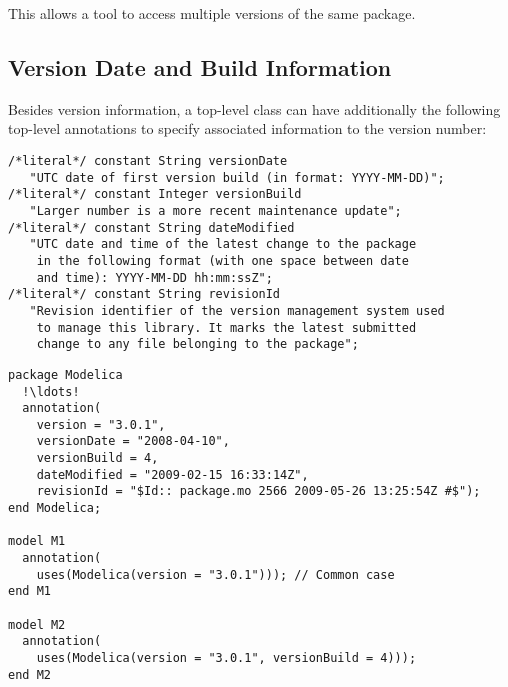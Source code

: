 This allows a tool to access multiple versions of the same package.

\subsection{Version Date and Build Information}\label{version-date-and-build-information}

Besides version information, a top-level class can have additionally the following top-level annotations to specify associated information to the version number:%
\begin{lstlisting}[language=modelica]
/*literal*/ constant String versionDate
   "UTC date of first version build (in format: YYYY-MM-DD)";
/*literal*/ constant Integer versionBuild
   "Larger number is a more recent maintenance update";
/*literal*/ constant String dateModified
   "UTC date and time of the latest change to the package
    in the following format (with one space between date
    and time): YYYY-MM-DD hh:mm:ssZ";
/*literal*/ constant String revisionId
   "Revision identifier of the version management system used
    to manage this library. It marks the latest submitted
    change to any file belonging to the package";
\end{lstlisting}%

\begin{example}
\begin{lstlisting}[language=modelica,mathescape=false,escapechar=!]
package Modelica
  !\ldots!
  annotation(
    version = "3.0.1",
    versionDate = "2008-04-10",
    versionBuild = 4,
    dateModified = "2009-02-15 16:33:14Z",
    revisionId = "$Id:: package.mo 2566 2009-05-26 13:25:54Z #$");
end Modelica;

model M1
  annotation(
    uses(Modelica(version = "3.0.1"))); // Common case
end M1

model M2
  annotation(
    uses(Modelica(version = "3.0.1", versionBuild = 4)));
end M2
\end{lstlisting}
\end{example}

